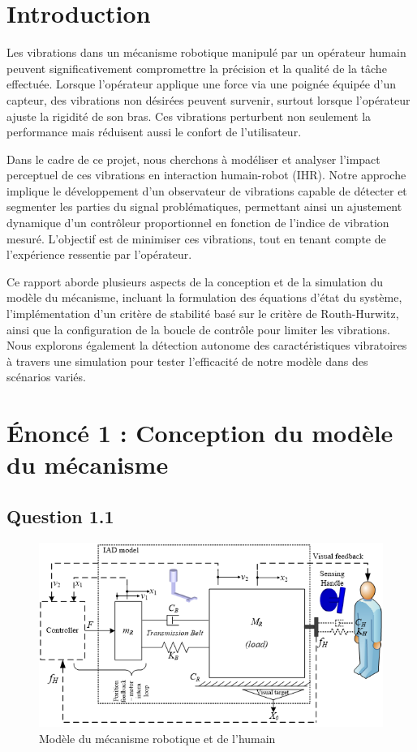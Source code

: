 \documentclass[a4paper,12pt]{article}
\begin{document}
    \tableofcontents
    \newpage
    
    \section{Introduction}
    Les vibrations dans un mécanisme robotique manipulé par un opérateur humain peuvent significativement compromettre la précision et la qualité de la tâche effectuée. Lorsque l’opérateur applique une force via une poignée équipée d’un capteur, des vibrations non désirées peuvent survenir, surtout lorsque l'opérateur ajuste la rigidité de son bras. Ces vibrations perturbent non seulement la performance mais réduisent aussi le confort de l’utilisateur.

    Dans le cadre de ce projet, nous cherchons à modéliser et analyser l'impact perceptuel de ces vibrations en interaction humain-robot (IHR). Notre approche implique le développement d'un observateur de vibrations capable de détecter et segmenter les parties du signal problématiques, permettant ainsi un ajustement dynamique d’un contrôleur proportionnel en fonction de l'indice de vibration mesuré. L’objectif est de minimiser ces vibrations, tout en tenant compte de l’expérience ressentie par l’opérateur.

    Ce rapport aborde plusieurs aspects de la conception et de la simulation du modèle du mécanisme, incluant la formulation des équations d’état du système, l’implémentation d’un critère de stabilité basé sur le critère de Routh-Hurwitz, ainsi que la configuration de la boucle de contrôle pour limiter les vibrations. Nous explorons également la détection autonome des caractéristiques vibratoires à travers une simulation pour tester l'efficacité de notre modèle dans des scénarios variés.
    
    \newpage
    \section{Énoncé 1 : Conception du modèle du mécanisme}
    \subsection{Question 1.1}
    \begin{figure}[h!]
        \centering
        \includegraphics[width=14cm]{./img/modele_humain-meca_robotique.png}
        \caption{Modèle du mécanisme robotique et de l'humain \label{fig:ModelMecaRobotHumain}}
    \end{figure}
    
\end{document}
